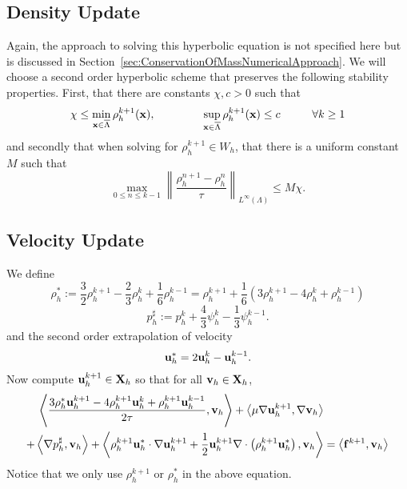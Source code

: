 \documentclass[letterpaper]{erdc}
\begin{document}
%
%
\subsection{Density Update}
Again, the approach to solving this hyperbolic equation is not specified here but is discussed in Section~\ref{sec:ConservationOfMassNumericalApproach}.  We will choose a second order hyperbolic scheme that preserves the following stability properties.  First, that there are constants $\chi, c > 0$ such that 
\begin{equation}
  \chi \leq \displaystyle\min_{\textbf{x}\in\overline{\Lambda}} \rho_h^{k+1}(\textbf{x}),  \hspace{1.5cm} \displaystyle\sup_{\textbf{x}\in\overline{\Lambda}}\rho_h^{k+1}(\textbf{x}) \leq c \hspace{1cm} \forall k\geq 1
\end{equation}
and secondly that when solving for $\rho_h^{k+1}\in W_h$, that there is a uniform constant $M$ such that
\begin{equation}
  \displaystyle\max_{0\leq n\leq k-1} \left \| \frac{\rho_h^{n+1} - \rho_h^{n}}{\tau}\right\|_{L^{\infty}(\Lambda)} \leq M\chi.
\end{equation}

%
%
\subsection{Velocity Update}
We define
\begin{equation}
  \rho_h^{*} := \frac{3}{2}\rho_h^{k+1} - \frac{2}{3}\rho_h^{k} + \frac{1}{6}\rho_h^{k-1} = \rho_h^{k+1} + \frac{1}{6}\left(3\rho_h^{k+1} -4\rho_h^{k} + \rho_h^{k-1} \right)
\end{equation}
\begin{equation}
  p_h^{\sharp} := p_h^{k} + \frac{4}{3}\psi_h^{k} - \frac{1}{3}\psi_h^{k-1}.
\end{equation}
and the second order extrapolation of velocity
\begin{equation}\label{eq:velocityextrapolation_uniformtimestep}
  \textbf{u}^{*}_h = 2\textbf{u}_h^{k}  - \textbf{u}_h^{k-1}.
\end{equation}
Now compute $\textbf{u}_h^{k+1}\in\textbf{X}_h$ so that for all $\textbf{v}_h\in\textbf{X}_h$,
\begin{equation}\label{eqn:bdf2lessrecognizableform}
  \begin{split}
    \left\langle \frac{3\rho_h^{*}\textbf{u}_h^{k+1} - 4\rho_h^{k+1}\textbf{u}_h^{k} + \rho_h^{k+1}\textbf{u}_h^{k-1}}{2\tau}, \textbf{v}_h \right\rangle  + \left\langle \mu\nabla\textbf{u}_h^{k+1}, \nabla\textbf{v}_h \right\rangle &\\
   + \left\langle \nabla p_h^{\sharp}, \textbf{v}_h \right\rangle + \left\langle \rho_h^{k+1}\textbf{u}_h^{*}\cdot\nabla\textbf{u}_h^{k+1} + \frac{1}{2}\textbf{u}_h^{k+1}\nabla\cdot\left( \rho_h^{k+1}\textbf{u}_h^{*} \right), \textbf{v}_h \right\rangle &= \left\langle \mathbf{f}^{k+1}, \textbf{v}_h \right\rangle
  \end{split}
\end{equation}
Notice that we only use $\rho_h^{k+1}$ or $\rho_h^{*}$ in the above equation.
\end{document}
